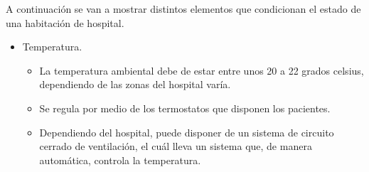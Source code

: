 \documentclass[a4paper]{article}
\begin{document}
A continuación se van a mostrar distintos elementos que condicionan el estado de una habitación de hospital.

\begin{itemize}
	\item Temperatura.
		\begin{itemize}
			\item La temperatura ambiental debe de estar entre unos 20 a 22 grados celsius, dependiendo de las zonas del hospital varía.
			\item Se regula por medio de los termostatos que disponen los pacientes.
			\item Dependiendo del hospital, puede disponer de un sistema de circuito cerrado de ventilación, el cuál lleva un sistema que, de manera automática, controla la temperatura.
		\end{itemize}
		

\end{itemize}
\end{document}

